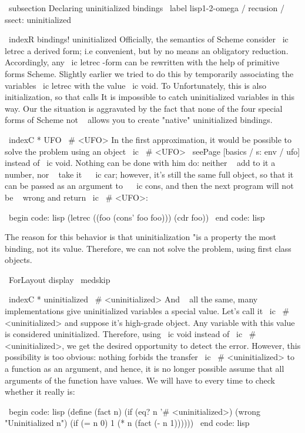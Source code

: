 {\ subsection {Declaring uninitialized bindings} %
\ label {lisp1-2-omega / recusion / ssect: uninitialized}

\ indexR {bindings! uninitialized}
Officially, the semantics of Scheme consider \ ic {letrec} a derived form; i.e
convenient, but by no means an obligatory reduction. Accordingly, any
\ ic {letrec} -form can be rewritten with the help of primitive forms Scheme. Slightly
earlier we tried to do this by temporarily associating the variables \ ic {letrec}
with the value \ ic {void}. To Unfortunately, this is also initialization, so that calls
It is impossible to catch uninitialized variables in this way. Our
the situation is aggravated by the fact that none of the four special forms of Scheme
not ~ allows you to create "native" uninitialized bindings.

\ indexC * {UFO} { \ # <UFO>}
In the first approximation, it would be possible to solve the problem using an object
\ ic { \ # <UFO>} \ seePage [basics / s: env / ufo] instead of \ ic {void}. Nothing can be done with him
do: neither ~ add to it a number, nor ~ take it ~ \ ic {car}; however, it's still the same
full object, so that it can be passed as an argument to ~ \ ic {cons}, and
then the next program will not be ~ wrong and return \ ic { \ # <UFO>}:

\ begin {code: lisp}
(letrec ((foo (cons' foo foo))) (cdr foo))
\ end {code: lisp}

The reason for this behavior is that uninitialization "is a property
the most binding, not its value. Therefore, we can not solve the problem,
using first class objects.

\ ForLayout {display} { \ medskip }

\ indexC * {uninitialized} { \ # <uninitialized>}
And ~ all the same, many implementations give uninitialized variables a special
value. Let's call it \ ic { \ # <uninitialized>} and suppose it's
high-grade object. Any variable with this value is considered
uninitialized. Therefore, using \ ic {void} instead of
\ ic { \ # <uninitialized>}, we get the desired opportunity to detect the error.
However, this possibility is too obvious: nothing forbids the transfer
\ ic { \ # <uninitialized>} to a function as an argument, and hence, it is no longer possible
assume that all arguments of the function have values. We will have to
every time to check whether it really is:

\ begin {code: lisp}
(define (fact n)
  (if (eq? n '# <uninitialized>)
      (wrong "Uninitialized n")
      (if (= n 0) 1
          (* n (fact (- n 1))))))
\ end {code: lisp}

}
